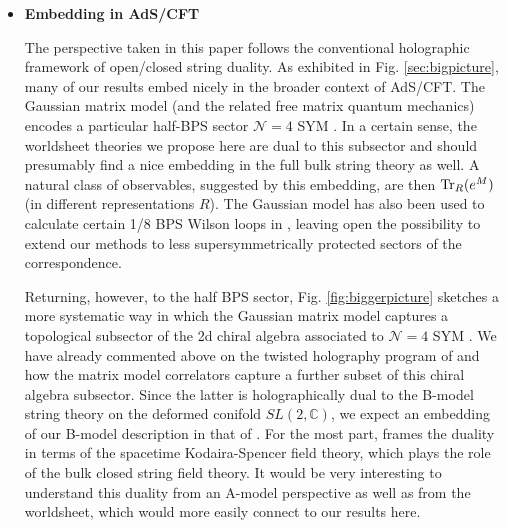 \documentclass[english]{article}
\begin{document}
\begin{itemize}
    

   



 

\item \textbf{Embedding in AdS/CFT}

    The perspective taken in this paper follows the conventional holographic framework of open/closed string duality. As exhibited in Fig. \ref{sec:bigpicture}, many of our results embed nicely in the broader context of AdS/CFT. 
    The Gaussian matrix model (and the related free matrix quantum mechanics) encodes a particular half-BPS sector $\mathcal{N}=4$ SYM \cite{erickson2000wilson, drukker2001exact, Lin:2004nb, berenstein2004toy,itzhaki2005large,pestun2012localization,okuyama2018connected}. In a certain sense, the worldsheet theories we propose here are dual to this subsector and should presumably find a nice embedding in the full bulk string theory as well. A natural class of observables, suggested by this embedding, are then ${\rm Tr}_R(e^M)$ (in different representations $R$). The Gaussian model has also been used to calculate certain 1/8 BPS Wilson loops in \cite{giombi2010correlators,giombiKomatsu2018exact}, leaving open the possibility to extend our methods to less supersymmetrically protected sectors of the correspondence. 
    
    Returning, however, to the half BPS sector, Fig. \ref{fig:biggerpicture} sketches a more systematic way in which the Gaussian matrix model captures a topological subsector of the 2d chiral algebra associated to $\mathcal{N}=4$ SYM \cite{bonettiRastelli2018}. We have already commented above on the twisted holography program of \cite{CostelloGaiottoTH} and how the matrix model correlators capture a further subset of this chiral algebra subsector. Since the latter is holographically dual to the B-model string theory on the deformed conifold $SL(2,\mathbb{C})$, we expect an embedding of our B-model description in that of \cite{CostelloGaiottoTH}. For the most part, \cite{CostelloGaiottoTH} frames the duality in terms of the spacetime Kodaira-Spencer field theory, which plays the role of the bulk closed string field theory. It would be very interesting to understand this duality from an A-model perspective as well as from the worldsheet, which would more easily connect to our results here. 


\end{itemize}
\end{document}
